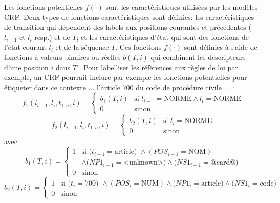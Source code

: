  Les fonctions potentielles $f(\cdot)$ sont les caractéristiques utilisées par les modèles CRF. Deux types de fonctions caractéristiques sont définies: les caractéristiques de transition qui dépendent des labels aux positions courantes et précédentes ($l_{i-1}$ et $ l_{i}$ resp.) et de $T$; et les caractéristiques d'état qui sont des fonctions de l'état courant $ l_{i} $ et de la séquence $ T $. Ces fonctions $f(\cdot)$ sont définies à l'aide de fonctions à valeurs binaires ou réelles $b(T,i)$ qui combinent les descripteurs d'une position $i$ dans $T$ \citep{Wallach2004crfintro}. Pour labelliser les références aux règles de loi par exemple, un CRF pourrait inclure par exemple les fonctions potentielles pour étiqueter   \fg{} dans ce contexte \og ... l'article 700 du code de procédure civile ... \fg{}:
{\small
\[f_1(l_{i-1},l_i,t_{1:n},i) = \left\lbrace \begin{array}{ll}
b_1(T,i) & \text{si } l_{i-1} = \text{NORME} \wedge l_i = \text{NORME} \\
0 & \text{sinon}
\end{array} \right.\]
\[f_2(l_{i-1},l_i,t_{1:n},i) = \left\lbrace \begin{array}{ll}
b_2(T,i) & \text{si }l_i = \text{NORME} \\
0 & \text{sinon}
\end{array} \right.\]
avec
\[b_1(T,i) = \left\lbrace \begin{array}{ll}
1 & \text{si } (t_{i-1} =\text{article) }\wedge (POS_{i-1}=\text{NOM}) \\&  \wedge  (NP1_{i-1}=\text{<unknown>)} \wedge (NS1_{i-1}=\text{@card@)} \\
0 & \text{sinon} 
\end{array} \right.\]
\[b_2(T,i) = \left\lbrace \begin{array}{ll}
1 & \text{si } (t_i =\text{700) }\wedge (POS_i=\text{NUM})  \wedge (NP1_i=\text{article)} 
\wedge (NS1_i=\text{code)} \\
0 & \text{sinon}
\end{array} \right.\]
}
